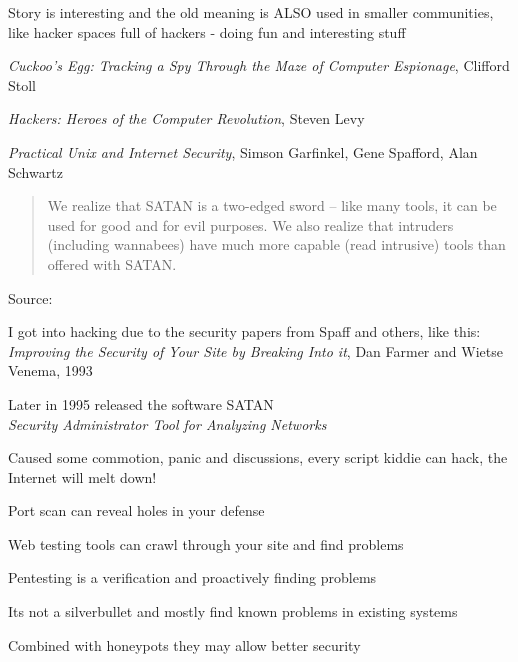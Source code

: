 \documentclass[Screen16to9,17pt]{foils}
\begin{document}
Story is interesting and the old meaning is ALSO used in smaller communities, like hacker spaces full of hackers - doing fun and interesting stuff
\begin{list2}
\item \emph{Cuckoo's Egg: Tracking a Spy Through the Maze of Computer
 Espionage},  Clifford Stoll
\item \emph{Hackers: Heroes of the Computer Revolution},
Steven Levy
\item \emph{Practical Unix and Internet Security},
Simson Garfinkel, Gene Spafford, Alan Schwartz
\end{list2}


\begin{quote}
We realize that SATAN is a two-edged sword -- like
many tools, it can be used for good and for evil
purposes. We also realize that intruders (including
wannabees) have much more capable (read intrusive)
tools than offered with SATAN.
\end{quote}
Source:

\begin{list2}
\item I got into hacking due to the security papers from Spaff and others, like this:
\emph{Improving the Security of Your Site by Breaking Into it}, Dan Farmer and Wietse Venema, 1993
\item Later in 1995 released the software SATAN\\
\emph{Security Administrator Tool for Analyzing Networks}
\item Caused some commotion, panic and discussions, every script kiddie can hack, the Internet will melt down!
\end{list2}




\begin{list2}
\item Port scan can reveal holes in your defense
\item Web testing tools can crawl through your site and find problems
\item Pentesting is a verification and proactively finding problems
\item Its not a silverbullet and mostly find known problems in existing systems
\item Combined with honeypots they may allow better security
\end{list2}
\end{document}

